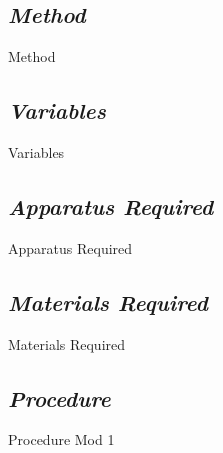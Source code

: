 

\subsection{\textit{Method}}

	{Method}

\subsection{\textit{Variables}}

	{Variables}

\subsection{\textit{Apparatus Required}}

	{Apparatus Required}

\subsection{\textit{Materials Required}}

	{Materials Required}

\subsection{\textit{Procedure}}

	{Procedure Mod 1}


